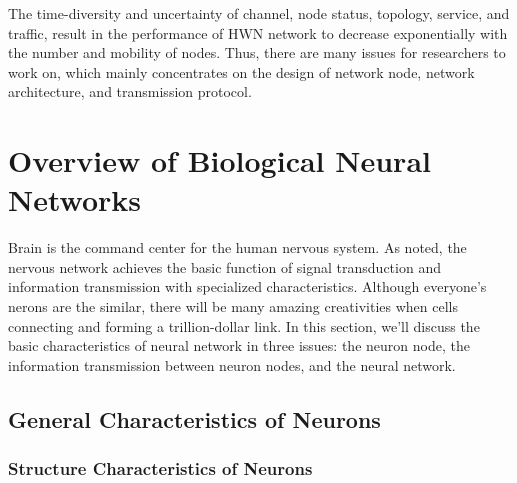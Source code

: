 \documentclass[journal,comsoc]{IEEEtran}
\begin{document}
	The time-diversity and uncertainty of channel, node status, topology, service, and traffic, 
	result in the performance of HWN network to decrease exponentially with the number and mobility of nodes.
	Thus, there are many issues for researchers to work on, 
	which mainly concentrates on the design of network node, network architecture, and transmission protocol.
	
	\section{Overview of Biological Neural Networks}
	\label{section: information_transmit}
	Brain is the command center for the human nervous system\cite{hart1983human}.
	As \cite{rsheng} noted, the nervous network achieves the basic function of signal transduction and information transmission with specialized characteristics.
	Although everyone's nerons are the similar, there will be many amazing creativities when cells connecting and forming a trillion-dollar link.
	In this section, we'll discuss the basic characteristics of neural network in three issues: 
	the neuron node, the  information transmission between neuron nodes, and the neural network.
	
	\subsection{General Characteristics of Neurons}
	\subsubsection{Structure Characteristics of Neurons}
	
\end{document}

